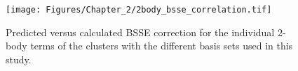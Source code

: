 \begin{figure}[h]
\begin{center}
\texttt{[image: Figures/Chapter\_2/2body\_bsse\_correlation.tif]}
\end{center}
\caption[Predicted versus calculated BSSE correction for the individual 2-body terms of the clusters with the different basis sets used in this study.]{Predicted versus calculated BSSE correction for the individual 2-body terms of the clusters with the different basis sets used in this study.}
\label{fig:MBE_I_F10}
\end{figure}